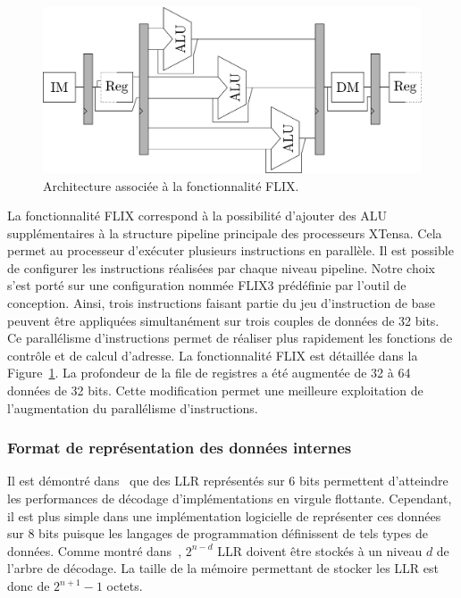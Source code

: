 \begin{figure}
\centering
\includegraphics[width=\textwidth]{main/ch3_fig/flix}
\caption{Architecture associée à la fonctionnalité FLIX.}
\label{fig:flix}
\end{figure}

La fonctionnalité FLIX correspond à la possibilité d'ajouter des ALU supplémentaires à la structure pipeline principale des processeurs XTensa. Cela permet au processeur d'exécuter plusieurs instructions en parallèle. Il est possible de configurer les instructions réalisées par chaque niveau pipeline. Notre choix s'est porté sur une configuration nommée FLIX3 prédéfinie par l'outil de conception. Ainsi, trois instructions faisant partie du jeu d'instruction de base peuvent être appliquées simultanément sur trois couples de données de 32 bits. Ce parallélisme d'instructions permet de réaliser plus rapidement les fonctions de contrôle et de calcul d'adresse. La fonctionnalité FLIX est détaillée dans la Figure~\ref{fig:flix}.
La profondeur de la file de registres a été augmentée de 32 à 64 données de 32 bits. Cette modification permet une meilleure exploitation de l'augmentation du parallélisme d'instructions.

\subsubsection{Format de représentation des données internes}
Il est démontré dans~\cite{sarkis_fast_2014} que des LLR représentés sur 6 bits permettent d'atteindre les performances de décodage d'implémentations en virgule flottante. Cependant, il est plus simple dans une implémentation logicielle de représenter ces données sur 8 bits puisque les langages de programmation définissent de tels types de données. Comme montré dans~\cite{leroux_hardware_2011}, $2^{n-d}$ LLR doivent être stockés à un niveau $d$ de l'arbre de décodage. La taille de la mémoire permettant de stocker les LLR est donc de $2^{n+1}-1$ octets.

